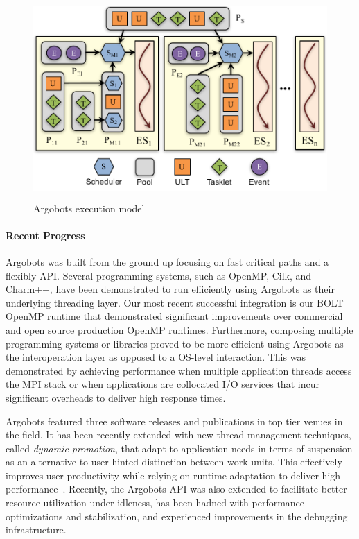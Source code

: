 \begin{figure}[htb]
  \centering
  \includegraphics[height=3in]{projects/2.3.2-Tools/2.3.2.11-SOLLVE/SOLLVE-ARGOBOTS.pdf}
  \caption{\label{fig:sollve-argobots}Argobots execution model}
\end{figure}


\paragraph{Recent Progress}

Argobots was built from the ground up focusing on fast critical paths
and a flexibly API. Several programming systems, such as OpenMP, Cilk,
and Charm++, have been demonstrated to run efficiently using Argobots
as their underlying threading layer. Our most recent successful
integration is our BOLT OpenMP runtime that demonstrated significant
improvements over commercial and open source production OpenMP
runtimes. Furthermore, composing multiple programming systems or
libraries proved to be more efficient using Argobots as the
interoperation layer as opposed to a OS-level interaction. This was
demonstrated by achieving performance when multiple application
threads access the MPI stack or when applications are collocated I/O
services that incur significant overheads to deliver high response
times.

Argobots featured three software releases and publications in top tier
venues in the field. It has been recently extended with new thread
management techniques, called \emph{dynamic promotion}, that adapt to
application needs in terms of suspension as an alternative to
user-hinted distinction between work units. This effectively improves
user productivity while relying on runtime adaptation to deliver high
performance~\cite{iwasaki2018}. Recently, the Argobots API was also
extended to facilitate better resource utilization under idleness, has
been hadned with performance optimizations and stabilization, and
experienced improvements in the debugging infrastructure.

